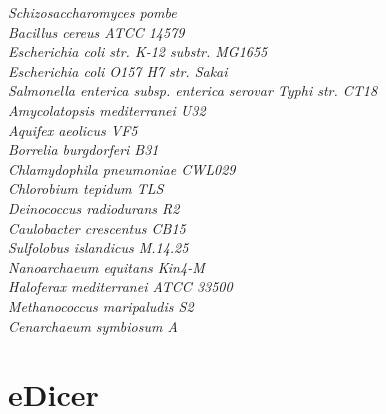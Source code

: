 \begin{table}
\begin{longtable}
		\textit{Schizosaccharomyces pombe}\\
		\textit{Bacillus cereus ATCC 14579}\\
		\textit{Escherichia coli str. K-12 substr. MG1655}\\
		\textit{Escherichia coli O157 H7 str. Sakai}\\
		\textit{Salmonella enterica subsp. enterica serovar Typhi str. CT18}\\
		\textit{Amycolatopsis mediterranei U32}\\
		\textit{Aquifex aeolicus VF5}\\
		\textit{Borrelia burgdorferi B31}\\
		\textit{Chlamydophila pneumoniae CWL029}\\
		\textit{Chlorobium tepidum TLS}\\
		\textit{Deinococcus radiodurans R2}\\
		\textit{Caulobacter crescentus CB15}\\
		\textit{Sulfolobus islandicus M.14.25}\\
		\textit{Nanoarchaeum equitans Kin4-M}\\
		\textit{Haloferax mediterranei ATCC 33500}\\
		\textit{Methanococcus maripaludis S2}\\
		\textit{Cenarchaeum symbiosum A}\\
	\hline
	\end{longtable}
	\caption{Table of genomes using in transcript binning pipeline.
		Genomes were chosen to be a representative of the sampled diversity of the 
		eukaryotic tree of life as possible}
	\label{tab:appen_genomes}
\end{table}

\section{eDicer}


